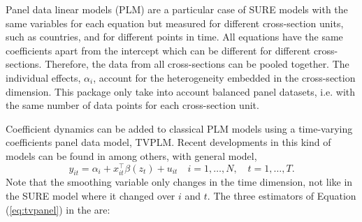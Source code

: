 Panel data linear models (PLM) are a particular case of SURE models with the same variables for each equation but measured for different cross-section units, such as countries, and for different points in time. All equations have the same coefficients apart from the intercept which can be different for different cross-sections. Therefore, the data from all cross-sections can be pooled together. The individual effects, $\alpha_i$, account for the heterogeneity embedded in the cross-section dimension. This package only take into account balanced panel datasets, i.e. with the same number of data points for each cross-section unit. 

Coefficient dynamics can be added to classical PLM models using a time-varying coefficients panel data model, TVPLM. Recent developments in this kind of models can be found in \citet{Sunetal2009, Dongetal2015, Casasetal2019b, Dongetal2018} among others, with general model,
\begin{equation}
y_{it} = \alpha_i  + x_{it}^\top \beta(z_{t}) +u_{it} \quad
i=1,\ldots,N , \quad t = 1, \ldots, T.
\label{eq:tvpanel} 
\end{equation}
Note that the smoothing variable only changes in the time dimension, not like in the SURE model where it changed over $i$ and $t$. The three estimators of Equation (\ref{eq:tvpanel}) in the  are:
